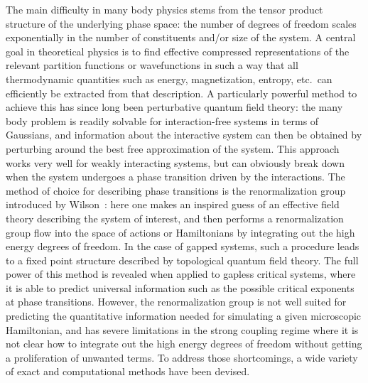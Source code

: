 \documentclass[rmp,aps,reprint,superscriptaddress,nobalancelastpage]{revtex4-1}
\begin{document}
The main difficulty in many body physics stems from the tensor product structure of the underlying phase space: the number of degrees of freedom scales exponentially in the number of constituents and/or size of the system. A central goal in theoretical physics is to find effective compressed representations of the relevant partition functions or wavefunctions in such a way that all thermodynamic quantities such as energy, magnetization, entropy, etc.\ can efficiently be extracted from that description. A particularly powerful method to achieve this has since long been perturbative quantum field theory: the many body problem is readily solvable for interaction-free systems in terms of Gaussians, and information about the interactive system can then be obtained by perturbing around the best free approximation of the system. This approach works very well for weakly interacting systems, but can obviously break down when the system undergoes a phase transition driven by the interactions. The method of choice for describing phase transitions is the renormalization group introduced by Wilson~\cite{wilson:RG}: here one makes an inspired guess of an effective field theory describing the system of interest, and then performs a renormalization group flow into the space of actions or Hamiltonians by integrating out the high energy degrees of freedom. In the case of gapped systems, such a procedure leads to a fixed point structure described by topological quantum field theory. The full power of this method is revealed when applied to gapless critical systems, where it is able to predict universal information such as the possible critical exponents at  phase transitions. However, the renormalization group  is not well suited for predicting the quantitative information needed for simulating a given microscopic Hamiltonian, and has severe limitations in the strong coupling regime where it is not clear how to integrate out the high energy degrees of freedom without getting a proliferation of unwanted terms. To address those shortcomings, a wide variety of exact and computational methods have been devised.
\end{document}
